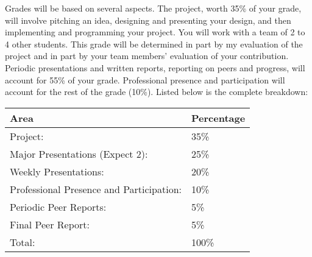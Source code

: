 Grades will be based on several aspects. The project, worth 35\% of your grade, will involve pitching an idea, designing and presenting your design, and then implementing and programming your project. You will work with a team of 2 to 4 other students. This grade will be determined in part by my evaluation of the project and in part by your team members' evaluation of your contribution. Periodic presentations and written reports, reporting on peers and progress, will account for 55\% of your grade. Professional presence and participation will account for the rest of the grade (10\%).
Listed below is the complete breakdown:
\par\vspace{1cm}
\begin{tabular}{ @{}ll@{} }
    \toprule
        Area & Percentage \\
    \midrule
        Project: & 35\% \\
        Major Presentations (Expect 2): & 25\% \\
        Weekly Presentations: & 20\% \\
        Professional Presence and Participation: & 10\% \\
        Periodic Peer Reports: & 5\% \\
        Final Peer Report: & 5\% \\
        Total: & 100\% \\
    \bottomrule
\end{tabular}